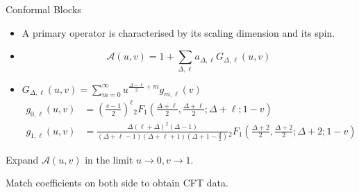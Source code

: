 \documentclass[pdf]{beamer}
\begin{document}
                \begin{frame}[t]{Conformal Blocks}
                    \begin{itemize}
                        \item <2->A primary operator is characterised by its scaling dimension and its spin.
                        \small
                        \item<3-> 
                        \begin{equation*}
                            \mathcal{A}(u,v) = 1 + \sum_{\Delta,\ell}a_{\Delta,\ell}G_{\Delta,\ell}(u,v)
                        \end{equation*}
                        
                        \item<4-> \small
                        $G_{\Delta,\ell}(u,v) = \sum_{m=0}^{\infty} u^{\frac{\Delta-\ell}{2}+m} g_{m,\ell}(v) $
                        \scriptsize
                        \vspace{5pt}
                        \begin{align*}
                            g_{0,\ell}(u,v) &= \left(\frac{v-1}{2}\right)^{\ell} {}_2F_1\left(\frac{\Delta+\ell}{2},\frac{\Delta+\ell}{2};\Delta+\ell;1-v\right)\\
                            g_{1,\ell}(u,v) &= \frac{\Delta(\ell+\Delta)^2(\Delta-1)}{(\Delta+\ell-1)(\Delta+\ell+1)(\Delta+1-\frac{d}{2})} {}_2F_1\left(\frac{\Delta+2}{2},\frac{\Delta+2}{2};\Delta+2;1-v\right)
                        \end{align*}
                    \end{itemize}

                        Expand  $\mathcal{A}(u,v)$ in the limit $u\to0,v\to1$.\par
                        Match coefficients on both side to obtain CFT data.
                    
                \end{frame}
\end{document}

